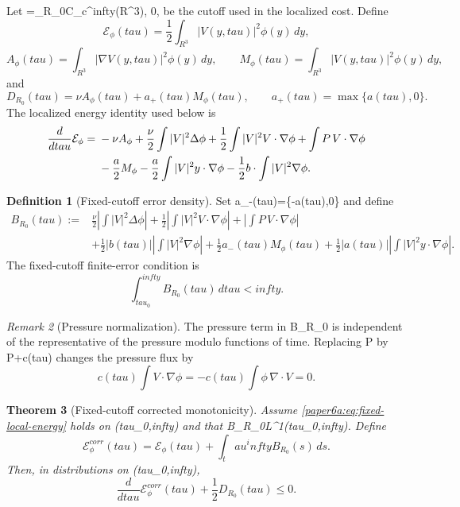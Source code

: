 \documentclass[11pt]{amsart}
\def\({}%
\def\){}%
\def\tilde#1{#1}%
\def\mathfrak#1{#1}%
\def\mathrm#1{#1}%
\def\mathbb#1{#1}%
\def\tau{tau}%
\def\infty{infty}%
\theoremstyle{plain}
\newtheorem{theorem}{Theorem}[section]
\theoremstyle{definition}
\newtheorem{definition}[theorem]{Definition}
\theoremstyle{remark}
\newtheorem{remark}[theorem]{Remark}
\begin{document}
Let \(\phi=\phi_{R_0}\in C_c^\infty(\mathbb R^3)\), \(0\le\phi{}\), be the
cutoff used in the localized cost.  Define
\[
  \mathcal E_\phi(\tau)=\frac12\int_{\mathbb R^3}|V(y,\tau)|^2\phi(y)\,dy,
\]
\[
  A_\phi(\tau)=\int_{\mathbb R^3}|\nabla V(y,\tau)|^2\phi(y)\,dy,\qquad
  M_\phi(\tau)=\int_{\mathbb R^3}|V(y,\tau)|^2\phi(y)\,dy,
\]
and
\[
  \tilde{\mathfrak D}_{R_0}(\tau)=\nu A_\phi(\tau)+a_+(\tau)M_\phi(\tau),
  \qquad a_+(\tau)=\max\{a(\tau),0\}.
\]
The localized energy identity used below is
\begin{align}
  \frac{d}{d\tau}\mathcal E_\phi
  ={}&-\nu A_\phi
  +\frac{\nu}{2}\int |V|^2\Delta\phi
  +\frac12\int |V|^2V\cdot\nabla\phi
  +\int P\,V\cdot\nabla\phi \notag\\
  &-\frac{a}{2}M_\phi
  -\frac{a}{2}\int |V|^2y\cdot\nabla\phi
  -\frac12 b\cdot\int |V|^2\nabla\phi .
  \label{paper6a:eq:fixed-local-energy}
\end{align}

\begin{definition}[Fixed-cutoff error density]\label{paper6a:def:fixed-error-density}
Set \(a_-(\tau)=\max\{-a(\tau),0\}\) and define
\begin{align*}
  B_{R_0}(\tau)
  :={}&
  \frac{\nu}{2}\left|\int |V|^2\Delta\phi\right|
  +\frac12\left|\int |V|^2V\cdot\nabla\phi\right|
  +\left|\int P\,V\cdot\nabla\phi\right|\\
  &+\frac12|b(\tau)|\left|\int |V|^2\nabla\phi\right|
  +\frac12a_-(\tau)M_\phi(\tau)
  +\frac12|a(\tau)|\left|\int |V|^2y\cdot\nabla\phi\right|.
\end{align*}
The fixed-cutoff finite-error condition is
\[
  \int_{\tau_0}^{\infty}B_{R_0}(\tau)\,d\tau<\infty .
\]
\end{definition}

\begin{remark}[Pressure normalization]
The pressure term in \(B_{R_0}\) is independent of the representative of the
pressure modulo functions of time.  Replacing \(P\) by \(P+c(\tau)\) changes
the pressure flux by
\[
  c(\tau)\int V\cdot\nabla\phi
  =
  -c(\tau)\int \phi\,\nabla\cdot V
  =0.
\]
\end{remark}

\begin{theorem}[Fixed-cutoff corrected monotonicity]
\label{paper6a:thm:fixed-corrected-monotonicity}
Assume \eqref{paper6a:eq:fixed-local-energy} holds on
\((\tau_0,\infty)\) and that \(B_{R_0}\in L^1(\tau_0,\infty)\).  Define
\[
  \mathcal E_\phi^{\mathrm{corr}}(\tau)
  =
  \mathcal E_\phi(\tau)+\int_\tau^\infty B_{R_0}(s)\,ds .
\]
Then, in distributions on \((\tau_0,\infty)\),
\[
  \frac{d}{d\tau}\mathcal E_\phi^{\mathrm{corr}}(\tau)
  +\frac12\tilde{\mathfrak D}_{R_0}(\tau)\le0 .
\]
\end{theorem}
\end{document}
